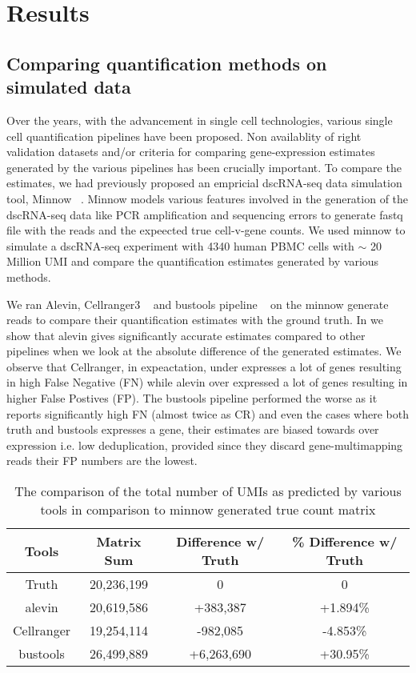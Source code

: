 \section{Results}
\subsection{Comparing quantification methods on simulated data}
\label{subsec:alv2_sims}
Over the years, with the advancement in single cell technologies, various single cell quantification 
pipelines have been proposed. Non availablity of right validation datasets and/or criteria for comparing 
gene-expression estimates generated by the various pipelines has been crucially important. To compare the estimates, we 
had previously proposed an empricial dscRNA-seq data simulation tool, Minnow ~\citep{sarkar2019minnow}. 
Minnow models various features involved in the generation of the dscRNA-seq data like PCR amplification and 
sequencing errors to generate fastq file with the reads and the expeected true cell-v-gene counts. 
We used minnow to simulate a dscRNA-seq experiment with 4340 human PBMC cells with $\sim$ 
20 Million UMI and compare the quantification estimates generated by various methods.

We ran Alevin, Cellranger3 ~\citep{tenx} and bustools pipeline ~\citep{melsted2019modular} on the minnow 
generate reads to compare their quantification estimates with the ground truth. 
In  we show that alevin gives significantly accurate estimates 
compared to other pipelines when we look at the absolute difference of the generated estimates. We observe 
that Cellranger, in expeactation, under expresses a lot of genes resulting in high False Negative (FN) 
while alevin over expressed a lot of genes resulting in higher False Postives (FP). 
The bustools pipeline performed the worse as it reports significantly high FN (almost twice as CR) 
and even the cases where both truth and bustools expresses a gene, their estimates are biased towards 
over expression i.e. low deduplication, provided since they discard gene-multimapping reads their FP 
numbers are the lowest.

\begin{table}[h!]
	\centering
	 \begin{tabular}{|| c | c c c||} 
		 \hline
		 Tools & Matrix Sum & Difference w/ Truth & \% Difference w/ Truth \\ [0.5ex] 
		 \hline\hline
		 Truth & 20,236,199  & 0 & 0 \\ 
		 \hline
		 alevin & 20,619,586 & +383,387 & +1.894\% \\
		 \hline
		 Cellranger & 19,254,114 & -982,085 & -4.853\% \\
		 \hline
		 bustools & 26,499,889 & +6,263,690 & +30.95\% \\ [1ex] 
		 \hline
 	\end{tabular}
	\caption{The comparison of the total number of UMIs as predicted by various tools 
	in comparison to minnow generated true count matrix }
	\label{tab:matrix_sum}
\end{table}


